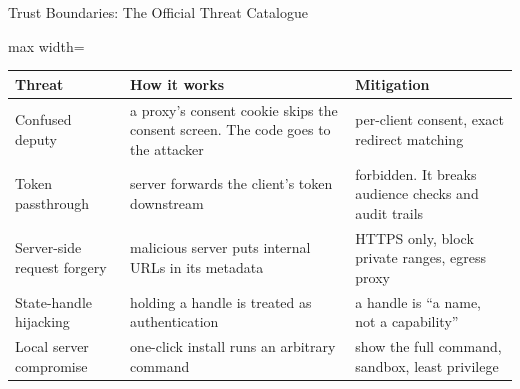 \begin{frame}{Trust Boundaries: The Official Threat Catalogue}
    \begin{center}
    \small
    \renewcommand{\arraystretch}{1.2}
    \begin{adjustbox}{max width=\linewidth}\begin{tabular}{>{\raggedright\arraybackslash}p{2.9cm}>{\raggedright\arraybackslash}p{5.3cm}>{\raggedright\arraybackslash}p{4.9cm}}
        \toprule
        \textbf{Threat} & \textbf{How it works} & \textbf{Mitigation} \\
        \midrule
        Confused deputy & a proxy's consent cookie skips the consent screen. The code goes to the attacker & per-client consent, exact redirect matching \\
        Token passthrough & server forwards the client's token downstream & forbidden. It breaks audience checks and audit trails \\
        Server-side request forgery & malicious server puts internal URLs in its metadata & HTTPS only, block private ranges, egress proxy \\
        State-handle hijacking & holding a handle is treated as authentication & a handle is ``a name, not a capability'' \\
        Local server compromise & one-click install runs an arbitrary command & show the full command, sandbox, least privilege \\
        \bottomrule
    \end{tabular}\end{adjustbox}
    \end{center}
\end{frame}

